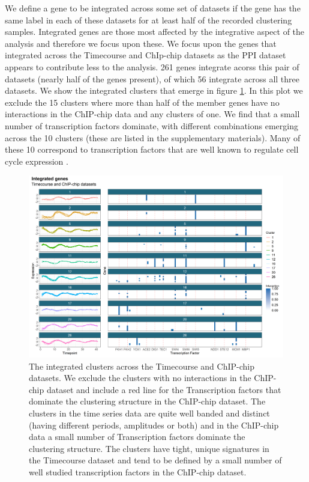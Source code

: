 \documentclass{bioinfo}
\begin{document}
We define a gene to be integrated across some set of datasets if the gene has the same label in each of these datasets for at least half of the recorded clustering samples. Integrated genes are those most affected by the integrative aspect of the analysis and therefore we focus upon these. We focus upon the genes that integrated across the Timecourse and ChIp-chip datasets as the PPI dataset appears to contribute less to the analysis. 261 genes integrate acorss this pair of datasets (nearly half of the genes present), of which 56 integrate across all three datasets. We show the integrated clusters that emerge in figure \ref{fig:timepointChIPchipFused}. In this plot we exclude the 15 clusters where more than half of the member genes have no interactions in the ChIP-chip data and any clusters of one. We find that a small number of transcription factors dominate, with different combinations emerging across the 10 clusters (these are listed in the supplementary materials). Many of these 10 correspond to transcription factors that are well known to regulate cell cycle expression \citep{simon2001serial}.

\begin{figure}
	\centering
	\includegraphics[scale=0.5]{./SupplementaryMaterial/Images/Yeast/timecourseChIPchipFused.png}
	\caption{The integrated clusters across the Timecourse and ChIP-chip datasets. We exclude the clusters with no interactions in the ChIP-chip dataset and include a red line for the Transcription factors that dominate the clustering structure in the ChIP-chip dataset. The clusters in the time series data are quite well banded and distinct (having different periods, amplitudes or both) and in the ChIP-chip data a small number of Transcription factors dominate the clustering structure. The clusters have tight, unique signatures in the Timecourse dataset and tend to be defined by a small number of well studied transcription factors in the ChIP-chip dataset.}
	\label{fig:timepointChIPchipFused}
\end{figure}
\end{document}
